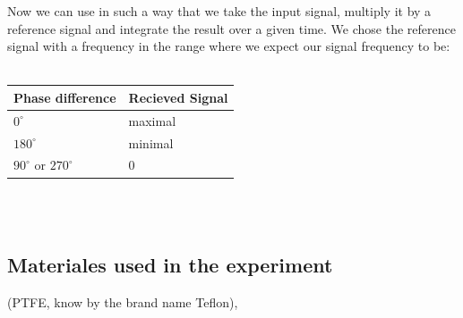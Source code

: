 Now we can 
use in such a way that we take the input signal, multiply it by a
reference signal and integrate the result over a given time.
We chose the reference signal with a frequency in the range where we
expect our signal frequency to be: \\\\
\begin{tabular}{l|l}
    \textbf{Phase difference} & \textbf{Recieved Signal} \\
    \hline
    $0^\circ$ & maximal\\
    $180^{\circ}$ & minimal \\
    $90^\circ$ or $270^\circ$ & 0 
\end{tabular}
\vspace{0.5cm}\\\\

\subsection{Materiales used in the experiment}

(PTFE, know by the brand name Teflon), 
